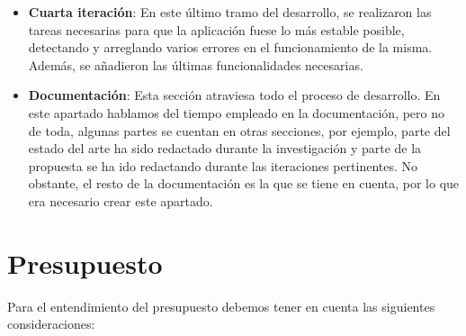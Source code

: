 \begin{itemize}
	\item \textbf{Cuarta iteración}: En este último tramo del desarrollo, se realizaron las tareas necesarias para que la aplicación fuese lo más estable posible, detectando y arreglando varios errores en el funcionamiento de la misma. Además, se añadieron las últimas funcionalidades necesarias.
	
	\item \textbf{Documentación}: Esta sección atraviesa todo el proceso de desarrollo. En este apartado hablamos del tiempo empleado en la documentación, pero no de toda, algunas partes se cuentan en otras secciones, por ejemplo, parte del estado del arte ha sido redactado durante la investigación y parte de la propuesta se ha ido redactando durante las iteraciones pertinentes. No obstante, el resto de la documentación es la que se tiene en cuenta, por lo que era necesario crear este apartado.
\end{itemize}

\section{Presupuesto} \label{presupuesto}

Para el entendimiento del presupuesto debemos tener en cuenta las siguientes consideraciones:

